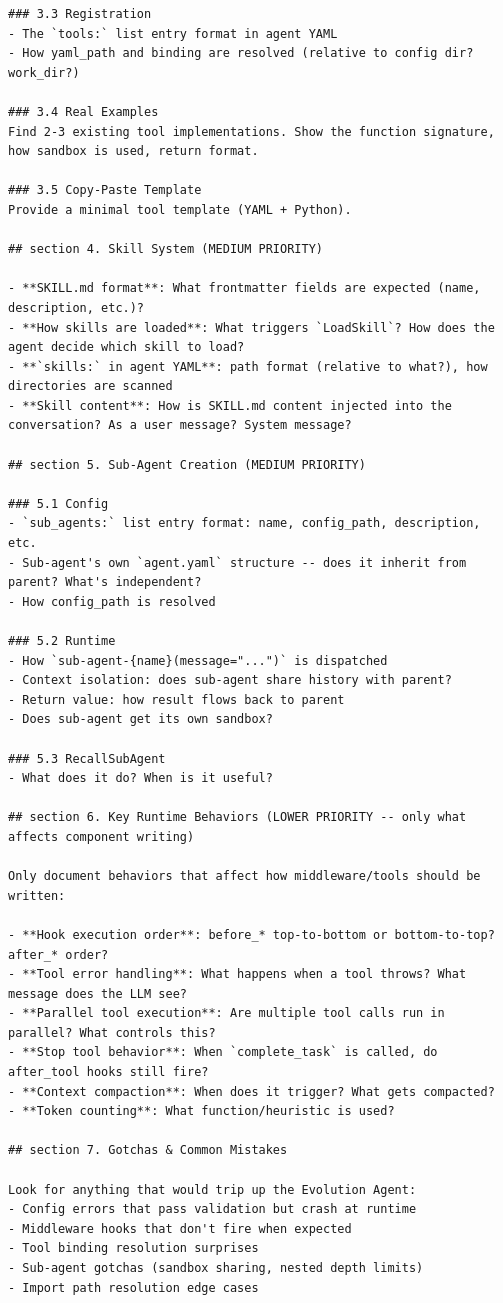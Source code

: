 \begin{tcolorbox}
\begin{lstlisting}
### 3.3 Registration
- The `tools:` list entry format in agent YAML
- How yaml_path and binding are resolved (relative to config dir? work_dir?)

### 3.4 Real Examples
Find 2-3 existing tool implementations. Show the function signature, how sandbox is used, return format.

### 3.5 Copy-Paste Template
Provide a minimal tool template (YAML + Python).

## section 4. Skill System (MEDIUM PRIORITY)

- **SKILL.md format**: What frontmatter fields are expected (name, description, etc.)?
- **How skills are loaded**: What triggers `LoadSkill`? How does the agent decide which skill to load?
- **`skills:` in agent YAML**: path format (relative to what?), how directories are scanned
- **Skill content**: How is SKILL.md content injected into the conversation? As a user message? System message?

## section 5. Sub-Agent Creation (MEDIUM PRIORITY)

### 5.1 Config
- `sub_agents:` list entry format: name, config_path, description, etc.
- Sub-agent's own `agent.yaml` structure -- does it inherit from parent? What's independent?
- How config_path is resolved

### 5.2 Runtime
- How `sub-agent-{name}(message="...")` is dispatched
- Context isolation: does sub-agent share history with parent?
- Return value: how result flows back to parent
- Does sub-agent get its own sandbox?

### 5.3 RecallSubAgent
- What does it do? When is it useful?

## section 6. Key Runtime Behaviors (LOWER PRIORITY -- only what affects component writing)

Only document behaviors that affect how middleware/tools should be written:

- **Hook execution order**: before_* top-to-bottom or bottom-to-top? after_* order?
- **Tool error handling**: What happens when a tool throws? What message does the LLM see?
- **Parallel tool execution**: Are multiple tool calls run in parallel? What controls this?
- **Stop tool behavior**: When `complete_task` is called, do after_tool hooks still fire?
- **Context compaction**: When does it trigger? What gets compacted?
- **Token counting**: What function/heuristic is used?

## section 7. Gotchas & Common Mistakes

Look for anything that would trip up the Evolution Agent:
- Config errors that pass validation but crash at runtime
- Middleware hooks that don't fire when expected
- Tool binding resolution surprises
- Sub-agent gotchas (sandbox sharing, nested depth limits)
- Import path resolution edge cases


\end{lstlisting}
\end{tcolorbox}
